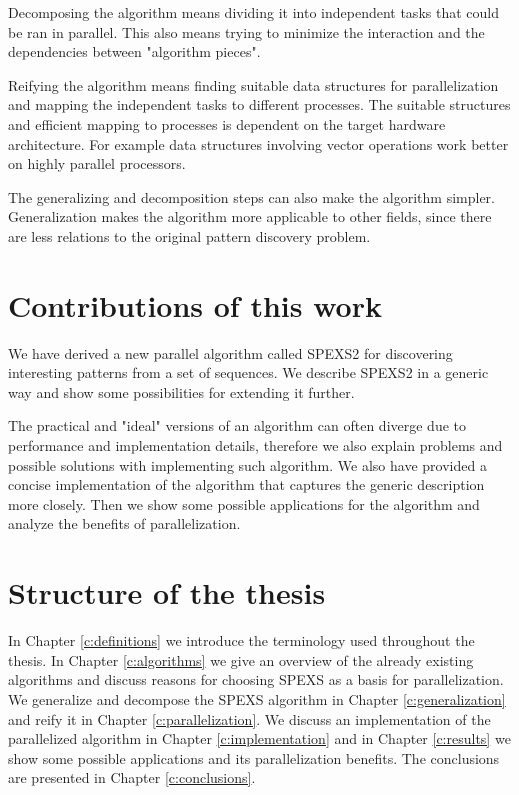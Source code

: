 Decomposing the algorithm means dividing it into independent tasks that could be ran in parallel. This also means trying to minimize the interaction and the dependencies between "algorithm pieces".

Reifying the algorithm means finding suitable data structures for parallelization and mapping the independent tasks to different processes. The suitable structures and efficient mapping to processes is dependent on the target hardware architecture. For example data structures involving vector operations work better on highly parallel processors.

The generalizing and decomposition steps can also make the algorithm simpler. Generalization makes the algorithm more applicable to other fields, since there are less relations to the original pattern discovery problem.

\section{Contributions of this work}

We have derived a new parallel algorithm called SPEXS2 for discovering interesting patterns from a set of sequences. We describe SPEXS2 in a generic way and show some possibilities for extending it further.

The practical and "ideal" versions of an algorithm can often diverge due to performance and implementation details, therefore we also explain problems and possible solutions with implementing such algorithm. We also have provided a concise implementation of the algorithm that captures the generic description more closely. Then we show some possible applications for the algorithm and analyze the benefits of parallelization.

\section{Structure of the thesis}

In Chapter \ref{c:definitions} we introduce the terminology used throughout the thesis. In Chapter \ref{c:algorithms} we give an overview of the already existing algorithms and discuss reasons for choosing SPEXS\cite{spexs} as a basis for parallelization. We generalize and decompose the SPEXS algorithm in Chapter \ref{c:generalization} and reify it in Chapter \ref{c:parallelization}. We discuss an implementation of the parallelized algorithm in Chapter \ref{c:implementation} and in Chapter \ref{c:results} we show some possible applications and its parallelization benefits. The conclusions are presented in Chapter \ref{c:conclusions}.
